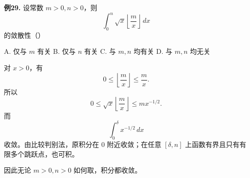 \begin{problemblock}
\textbf{例29.} 设常数 \(m>0,n>0\)，则
\[
\int_0^n\sqrt{x}\left\lfloor\frac{m}{x}\right\rfloor\,dx
\]
的敛散性（\quad）

A. 仅与 \(m\) 有关\qquad
B. 仅与 \(n\) 有关\qquad
C. 与 \(m,n\) 均有关\qquad
D. 与 \(m,n\) 均无关
\end{problemblock}
\begin{solutionblock}
对 \(x>0\)，有
\[
0\le \left\lfloor\frac mx\right\rfloor\le \frac mx.
\]
所以
\[
0\le \sqrt{x}\left\lfloor\frac mx\right\rfloor
\le m x^{-1/2}.
\]
而
\[
\int_0^\delta x^{-1/2}\,dx
\]
收敛。由比较判别法，原积分在 \(0\) 附近收敛；在任意 \([\delta,n]\) 上函数有界且只有有限多个跳跃点，也可积。

因此无论 \(m>0,n>0\) 如何取，积分都收敛。
\end{solutionblock}

